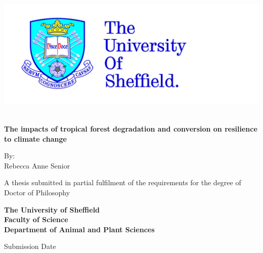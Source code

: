 \thispagestyle{empty}
\begin{center}
\includegraphics{logos/tuoslogo_cmyk_hi.jpg}
\vspace{1.5cm}
 {\Huge\bfseries \\The impacts of tropical forest degradation and conversion on resilience to climate change\par}
 \vspace{1.5cm}
 {\Large By:\\ Rebecca Anne Senior\par}
 \vspace{1.5cm}
 {A thesis submitted in partial fulfilment of the requirements for the degree of\\ Doctor of Philosophy\par}
 \vspace{2cm}\bfseries
 The University of Sheffield\\
 Faculty of Science\\
 Department of Animal and Plant Sciences\par
 \vfill
 {\large {\normalfont Submission Date\par}}
\end{center}

\setlength{\abovedisplayskip}{-5pt}
\setlength{\abovedisplayshortskip}{-5pt}


\nocite{gonzalez_del_pliego_unpublished, 
gonzalez-di_pierro_effects_2011,
  goode_unpublished,
  goode_seed_2009,
  ibanez_sharp_2013,
  lebrija-trejos_environmental_2011,
  negrete-yankelevich_successional_2007,
  santos_interaccion_2011,
  santos_insect_2012,
  sonnleitner_microclimatic_2009,
  wood_no_2008,
  yashiro_effects_2008,
  adachi_differences_2006,
  hardwick_aboveground_2016,
  hardwick_relationship_2015,
  klein_predatorprey_2002,
  wangluk_role_2013,
  werner_n2o_2006,
  holl_factors_1999,
  liu_exotic_2002,
  king_ants_1998,
  badejo_response_2004,
  campos_response_2006,
  badejo_seasonal_1990,
  furukawa_effect_2005}